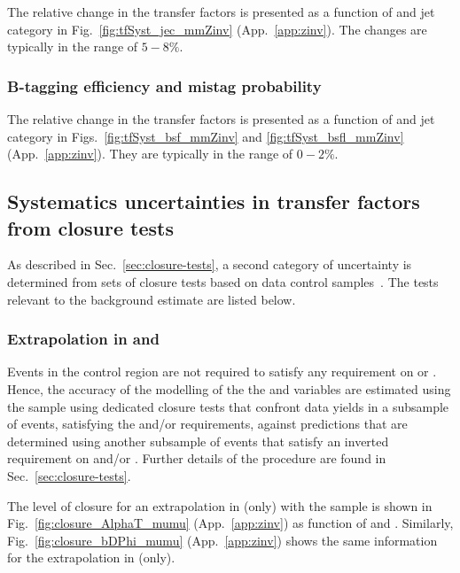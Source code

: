 The relative change in the transfer factors is presented as a function
of \scalht and jet category in Fig.~\ref{fig:tfSyst_jec_mmZinv}
(App.~\ref{app:zinv}). The changes are typically in the range of
$5-8\%$.

\subsubsection{B-tagging efficiency and mistag probability}
\label{sec:tfSyst_btag-zinv}

The relative change in the transfer factors is presented as a function
of \scalht and jet category in Figs.~\ref{fig:tfSyst_bsf_mmZinv} and
\ref{fig:tfSyst_bsfl_mmZinv} (App.~\ref{app:zinv}).  They are
typically in the range of $0-2\%$.

\subsection{Systematics uncertainties in transfer factors from closure tests}
\label{sec:closure-tests-zinv}

As described in Sec.~\ref{sec:closure-tests}, a second category of
uncertainty is determined from sets of closure tests based on data
control samples~\cite{RA1Paper2012}. The tests relevant to the \znunuj
background estimate are listed below. 

\subsubsection{Extrapolation in \texorpdfstring{\alphat}{AlphaT} and
  \texorpdfstring{\bdphi}{biased dPhi}}
\label{sec:tfSyst_alphaT-zinv}

Events in the \mmj control region are not required to satisfy any
requirement on \alphat or \bdphi. Hence, the accuracy of the modelling
of the the \alphat and \bdphi variables are estimated using the \mmj
sample using dedicated closure tests that confront data yields in a
subsample of \mmj events, satisfying the \alphat and/or \bdphi
requirements, against predictions that are determined using another
subsample of \mmj events that satisfy an inverted requirement on
\alphat and/or \bdphi. Further details of the procedure are found in
Sec.~\ref{sec:closure-tests}. 

The level of closure for an extrapolation in \alphat (only) with the
\mmj sample is shown in Fig.~\ref{fig:closure_AlphaT_mumu}
(App.~\ref{app:zinv}) as function of \scalht and \njet. Similarly,
Fig.~\ref{fig:closure_bDPhi_mumu} (App.~\ref{app:zinv}) shows the same
information for the extrapolation in \bdphi (only). 

